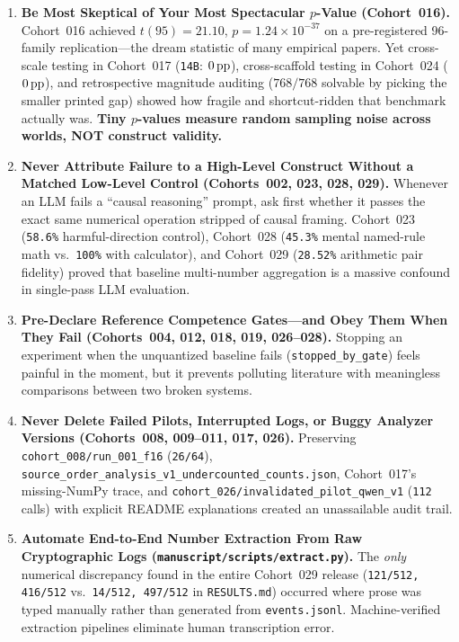\begin{enumerate}
  \item \textbf{Be Most Skeptical of Your Most Spectacular $p$-Value (Cohort~016).} Cohort~016 achieved $t(95)=21.10$, $p = 1.24\times 10^{-37}$ on a pre-registered 96-family replication---the dream statistic of many empirical papers. Yet cross-scale testing in Cohort~017 (\texttt{14B}: $0\,\mathrm{pp}$), cross-scaffold testing in Cohort~024 ($0\,\mathrm{pp}$), and retrospective magnitude auditing ($768/768$ solvable by picking the smaller printed gap) showed how fragile and shortcut-ridden that benchmark actually was. \textbf{Tiny $p$-values measure random sampling noise across worlds, NOT construct validity.}
  \item \textbf{Never Attribute Failure to a High-Level Construct Without a Matched Low-Level Control (Cohorts~002, 023, 028, 029).} Whenever an LLM fails a ``causal reasoning'' prompt, ask first whether it passes the exact same numerical operation stripped of causal framing. Cohort~023 (\texttt{58.6\%} harmful-direction control), Cohort~028 (\texttt{45.3\%} mental named-rule math vs.\ \texttt{100\%} with calculator), and Cohort~029 (\texttt{28.52\%} arithmetic pair fidelity) proved that baseline multi-number aggregation is a massive confound in single-pass LLM evaluation.
  \item \textbf{Pre-Declare Reference Competence Gates---and Obey Them When They Fail (Cohorts~004, 012, 018, 019, 026--028).} Stopping an experiment when the unquantized baseline fails (\texttt{stopped\_by\_gate}) feels painful in the moment, but it prevents polluting literature with meaningless comparisons between two broken systems.
  \item \textbf{Never Delete Failed Pilots, Interrupted Logs, or Buggy Analyzer Versions (Cohorts~008, 009--011, 017, 026).} Preserving \texttt{cohort\_008/run\_001\_f16} (\texttt{26/64}), \texttt{source\_order\_analysis\_v1\_undercounted\_counts.json}, Cohort~017's missing-NumPy trace, and \texttt{cohort\_026/invalidated\_pilot\_qwen\_v1} (\texttt{112} calls) with explicit README explanations created an unassailable audit trail.
  \item \textbf{Automate End-to-End Number Extraction From Raw Cryptographic Logs (\texttt{manuscript/scripts/extract.py}).} The \emph{only} numerical discrepancy found in the entire Cohort~029 release (\texttt{121/512, 416/512} vs.\ \texttt{14/512, 497/512} in \texttt{RESULTS.md}) occurred where prose was typed manually rather than generated from \texttt{events.jsonl}. Machine-verified extraction pipelines eliminate human transcription error.
\end{enumerate}

